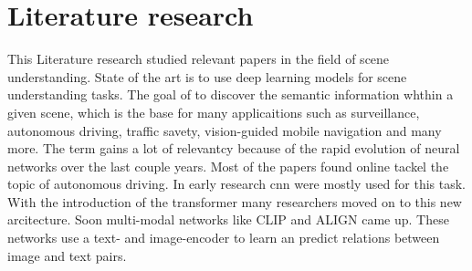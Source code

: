 \chapter{Literature research}

This Literature research studied relevant papers in the field of scene understanding.
State of the art is to use deep learning models for scene understanding tasks.
The goal of to discover the semantic information whthin a given scene, which is the base for many applicaitions such as surveillance, autonomous driving, traffic savety, vision-guided mobile navigation and many more.
The term gains a lot of relevantcy because of the rapid evolution of neural networks over the last couple years.
Most of the papers found online tackel the topic of autonomous driving\cite{sceneunderstandingautdriving1}.
In early research \acrfull{cnn}\cite{SegNet} were mostly used for this task.
With the introduction of the transformer \cite{attentionisallyouneed} many researchers moved on to this new arcitecture.
Soon multi-modal networks like CLIP\cite{clip} and ALIGN\cite{ALIGN} came up.
These networks use a text- and image-encoder to learn an predict relations between image and text pairs.

